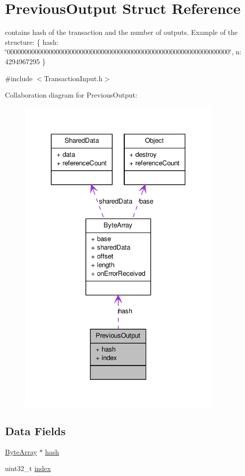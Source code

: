 \hypertarget{struct_previous_output}{
\section{PreviousOutput Struct Reference}
\label{struct_previous_output}
}


contains hash of the transaction and the number of outputs. Example of the structure: \{ hash: \char`\"{}0000000000000000000000000000000000000000000000000000000000000000\char`\"{}, n: 4294967295 \}  




{\ttfamily \#include $<$TransactionInput.h$>$}



Collaboration diagram for PreviousOutput:\nopagebreak
\begin{figure}[H]
\begin{center}
\leavevmode
\includegraphics[width=282pt]{struct_previous_output__coll__graph}
\end{center}
\end{figure}
\subsection*{Data Fields}
\begin{DoxyCompactItemize}
\item 
\hyperlink{struct_byte_array}{ByteArray} $\ast$ \hyperlink{struct_previous_output_a5695540112ce950745e15ab422b3f067}{hash}
\item 
uint32\_\-t \hyperlink{struct_previous_output_aafd95f8c7a99b9189ede7cdf0871ebe8}{index}
\end{DoxyCompactItemize}


